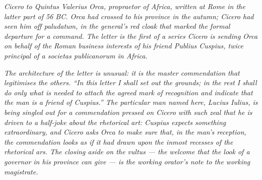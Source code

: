 
\textit{Cicero to Quintus Valerius Orca, propraetor of Africa,
written at Rome in the latter part of 56 BC. Orca had crossed
to his province in the autumn; Cicero had seen him off
\textit{paludatum}, in the general's red cloak that marked the
formal departure for a command. The letter is the first of a
series Cicero is sending Orca on behalf of the Roman business
interests of his friend Publius Cuspius, twice principal of a
\textit{societas publicanorum} in Africa.}

\textit{The architecture of the letter is unusual: it is the
master commendation that legitimises the others. ``In this
letter I shall set out the grounds; in the rest I shall do
only what is needed to attach the agreed mark of recognition
and indicate that the man is a friend of Cuspius.'' The
particular man named here, Lucius Iulius, is being singled
out for a commendation pressed on Cicero with such zeal that
he is driven to a half-joke about the rhetorical art: Cuspius
expects something \textit{extraordinary}, and Cicero asks
Orca to make sure that, in the man's reception, the
commendation looks as if it had drawn upon the inmost
recesses of the rhetorical \textit{ars}. The closing aside on
the \textit{vultus} --- the welcome that the look of a
governor in his province can give --- is the working orator's
note to the working magistrate.}
